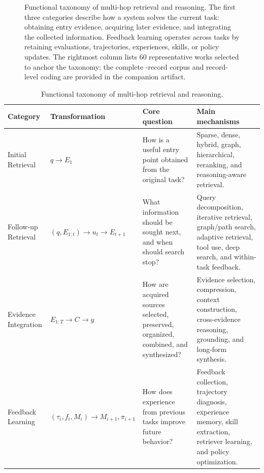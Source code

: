 \begin{figure}[tbp]
\centering
\resizebox{0.99\textwidth}{!}{}
\caption{Functional taxonomy of multi-hop retrieval and reasoning. The first three categories describe how a system solves the current task: obtaining entry evidence, acquiring later evidence, and integrating the collected information. Feedback learning operates across tasks by retaining evaluations, trajectories, experiences, skills, or policy updates. The rightmost column lists 60 representative works selected to anchor the taxonomy; the complete \CorpusSize-record corpus and record-level coding are provided in the companion artifact.}
\label{fig:taxonomy_tree}
\end{figure}

\begin{table}[tbp]
\centering
\caption{Functional taxonomy of multi-hop retrieval and reasoning.}
\label{tab:taxonomy_overview}
\small
\begin{tabularx}{\textwidth}{@{}p{3.0cm}p{3.4cm}Y Y@{}}
\toprule
Category & Transformation & Core question & Main mechanisms \\
\midrule
Initial Retrieval & $q \rightarrow E_1$ & How is a useful entry point obtained from the original task? & Sparse, dense, hybrid, graph, hierarchical, reranking, and reasoning-aware retrieval. \\
Follow-up Retrieval & $(q,E_{1:t}) \rightarrow u_t \rightarrow E_{t+1}$ & What information should be sought next, and when should search stop? & Query decomposition, iterative retrieval, graph/path search, adaptive retrieval, tool use, deep search, and within-task feedback. \\
Evidence Integration & $E_{1:T} \rightarrow C \rightarrow y$ & How are acquired sources selected, preserved, organized, combined, and synthesized? & Evidence selection, compression, context construction, cross-evidence reasoning, grounding, and long-form synthesis. \\
Feedback Learning & $(\tau_i,f_i,M_i) \rightarrow M_{i+1},\pi_{i+1}$ & How does experience from previous tasks improve future behavior? & Feedback collection, trajectory diagnosis, experience memory, skill extraction, retriever learning, and policy optimization. \\
\bottomrule
\end{tabularx}
\end{table}

